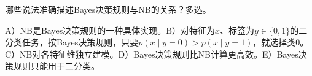 哪些说法准确描述Bayes决策规则与NB的关系？多选。


A）NB是Bayes决策规则的一种具体实现。B）对特征为\(x\)、标签为\(y\in\{0,1\}\)的二分类任务，按Bayes决策规则，只要\(p(x\mid y=0)>p(x\mid y=1)\)，就选择类0。C）NB对各特征维独立建模。D）Bayes决策规则比NB计算更高效。E）Bayes决策规则只能用于二分类。
